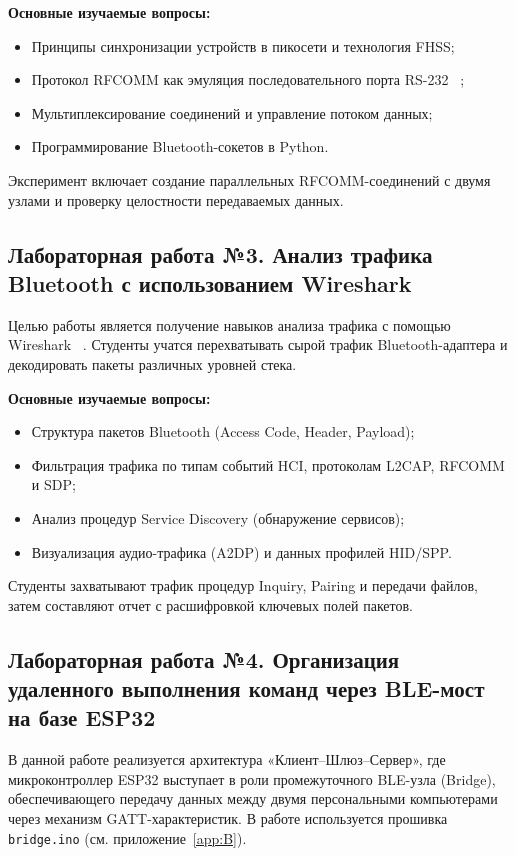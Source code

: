 \textbf{Основные изучаемые вопросы:}
\begin{itemize}[nosep]
    \item Принципы синхронизации устройств в пикосети и технология FHSS;
    \item Протокол RFCOMM как эмуляция последовательного порта RS-232 ~\cite{rfcomm_spp_guide};
    \item Мультиплексирование соединений и управление потоком данных;
    \item Программирование Bluetooth-сокетов в Python.
\end{itemize}
Эксперимент включает создание параллельных RFCOMM-соединений с двумя узлами и проверку целостности передаваемых данных.

\subsection{Лабораторная работа №3. Анализ трафика Bluetooth с использованием Wireshark}
Целью работы является получение навыков анализа трафика с помощью Wireshark ~\cite{wireshark_bt_doc}. Студенты учатся перехватывать сырой трафик Bluetooth-адаптера и декодировать пакеты различных уровней стека.

\textbf{Основные изучаемые вопросы:}
\begin{itemize}[nosep]
    \item Структура пакетов Bluetooth (Access Code, Header, Payload);
    \item Фильтрация трафика по типам событий HCI, протоколам L2CAP, RFCOMM и SDP;
    \item Анализ процедур Service Discovery (обнаружение сервисов);
    \item Визуализация аудио-трафика (A2DP) и данных профилей HID/SPP.
\end{itemize}
Студенты захватывают трафик процедур Inquiry, Pairing и передачи файлов, затем составляют отчет с расшифровкой ключевых полей пакетов.

\subsection{Лабораторная работа №4. Организация удаленного выполнения команд через BLE-мост на базе ESP32}

В данной работе реализуется архитектура «Клиент–Шлюз–Сервер», где микроконтроллер ESP32 выступает в роли промежуточного BLE-узла (Bridge), обеспечивающего передачу данных между двумя персональными компьютерами через механизм GATT-характеристик. В работе используется прошивка \texttt{bridge.ino} (см. приложение~\ref{app:B}).

